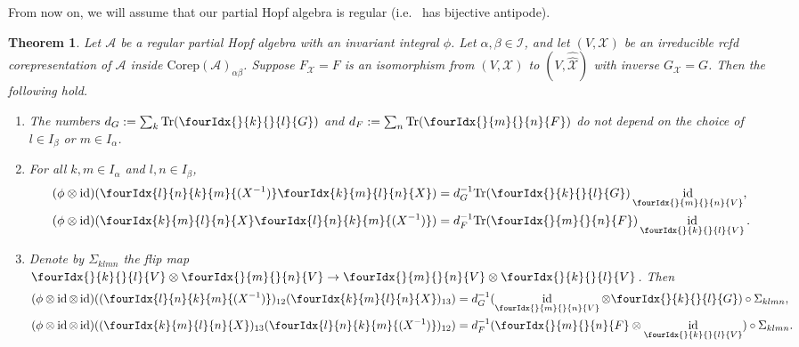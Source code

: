 \documentclass[10pt]{article}
\DeclareMathOperator{\id}{id}
\newcommand{\Corep}{\mathrm{Corep}}
\newcommand{\Tr}{\mathrm{Tr}}
\newcommand{\Gr}[5]{\fourIdx{#2}{#4}{#3}{#5}{#1}}%
\newcommand{\Gru}[3]{\Gr{#1}{}{}{#2}{#3}}
\newtheorem{Theorem}{Theorem}[section]
\theoremstyle{definition}
\numberwithin{equation}{section}
\begin{document}
From now on, we will assume that our partial Hopf algebra is regular (i.e.~ has bijective antipode).

\begin{Theorem} \label{thm:rep-orthogonality} Let $\mathcal{A}$ be a
  regular partial Hopf algebra with an invariant integral $\phi$. Let $\alpha,\beta\in \mathscr{I}$, and let $(V,\mathscr{X})$
  be an irreducible rcfd corepresentation of $\mathscr{A}$ inside $\Corep(\mathscr{A})_{\alpha\beta}$. Suppose
  $F_{\mathscr{X}}=F$ is an isomorphism from $(V,\mathscr{X})$ to
  $(V,\hat{\hat{\mathscr{X}}})$ with inverse
  $G_{\mathscr{X}}= G$. Then the following hold.
  \begin{enumerate}[label=(\arabic*)]
  \item The numbers $d_G:=\sum_{k} \Tr (\Gru{G}{k}{l})$ and $d_F:=\sum_{n} \Tr (\Gru{F}{m}{n})$ do not depend on the choice of $l \in I_\beta$ or $m\in I_\alpha$.
    \item  For all $k,m \in I_\alpha$ and $l,n\in I_\beta$,
    \begin{align*}
      (\phi \otimes \id)(\Gr{(X^{-1})}{l}{k}{n}{m}\Gr{X}{k}{l}{m}{n})
      &=d_G^{-1}\Tr(\Gru{G}{k}{l})
      \id_{\Gru{V}{m}{n}}, \\
      (\phi \otimes \id)(\Gr{X}{k}{l}{m}{n}\Gr{(X^{-1})}{l}{k}{n}{m})
      &=d_F^{-1}\Tr(\Gru{F}{m}{n})
      \id_{\Gru{V}{k}{l}}.
    \end{align*}
  \item Denote by $\Sigma_{klmn}$ the flip map $\Gru{V}{k}{l}
    \otimes \Gru{V}{m}{n} \to \Gru{V}{m}{n}
    \otimes \Gru{V}{k}{l}$. Then
 \begin{align*}
   (\phi \otimes \id \otimes
   \id)((\Gr{(X^{-1})}{l}{k}{n}{m})_{12}(\Gr{X}{k}{l}{m}{n})_{13}) &=
   d_G^{-1}
   (\id_{\Gru{V}{m}{n}} \otimes \Gru{G}{k}{l})
   \circ \Sigma_{klmn}, \\
   (\phi \otimes \id \otimes
   \id)((\Gr{X}{k}{l}{m}{n})_{13}(\Gr{(X^{-1})}{l}{k}{n}{m})_{12}) &= d_F^{-1} (\Gru{F}{m}{n}
   \otimes \id_{\Gru{V}{k}{l}}) \circ \Sigma_{klmn}.
 \end{align*}
\end{enumerate}
  \end{Theorem}
\end{document}
